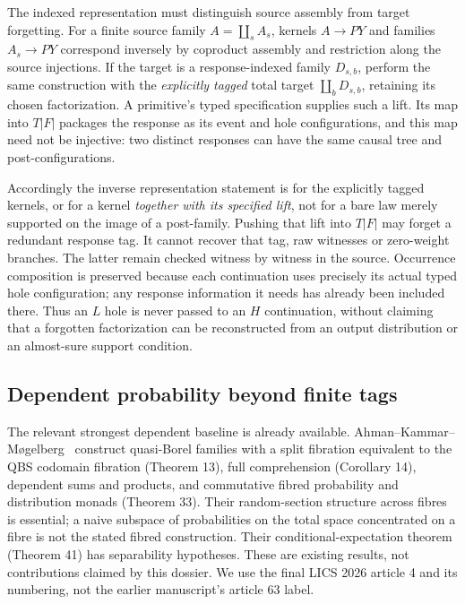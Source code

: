 \documentclass[11pt,a4paper]{article}
\theoremstyle{definition}
\begin{document}
The indexed representation must distinguish source assembly from target
forgetting. For a finite source family $A=\coprod_s A_s$, kernels
$A\to PY$ and families $A_s\to PY$ correspond inversely by coproduct
assembly and restriction along the source injections. If the target is a
response-indexed family $D_{s,b}$, perform the same construction with the
\emph{explicitly tagged} total target $\coprod_bD_{s,b}$, retaining its
chosen factorization. A primitive's typed specification supplies such a
lift. Its map into $T|F|$ packages the response as its event and hole
configurations, and this map need not be injective: two distinct responses
can have the same causal tree and post-configurations.

Accordingly the inverse representation statement is for the explicitly
tagged kernels, or for a kernel \emph{together with its specified lift},
not for a bare law merely supported on the image of a post-family. Pushing
that lift into $T|F|$ may forget a redundant response tag. It cannot recover
that tag, raw witnesses or zero-weight branches. The latter remain checked
witness by witness in the source. Occurrence composition is preserved
because each continuation uses precisely its actual typed hole
configuration; any response information it needs has already been
included there. Thus an $L$ hole is never passed to an $H$ continuation,
without claiming that a forgotten factorization can be reconstructed from
an output distribution or an almost-sure support condition.

\subsection{Dependent probability beyond finite tags}
The relevant strongest dependent baseline is already available.
Ahman--Kammar--M\o gelberg~\cite{QBF2026} construct quasi-Borel families with
a split fibration equivalent to the QBS codomain fibration (Theorem 13),
full comprehension (Corollary 14), dependent sums and products, and
commutative fibred probability and distribution monads (Theorem 33).
Their random-section structure across fibres is essential; a naive subspace
of probabilities on the total space concentrated on a fibre is not the
stated fibred construction. Their conditional-expectation theorem
(Theorem 41) has separability hypotheses. These are existing results,
not contributions claimed by this dossier. We use the final LICS 2026
article 4 and its numbering, not the earlier manuscript's article 63 label.
\end{document}
